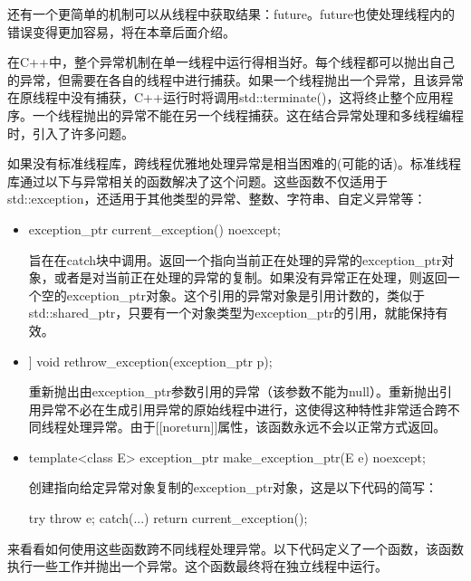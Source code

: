还有一个更简单的机制可以从线程中获取结果：future。future也使处理线程内的错误变得更加容易，将在本章后面介绍。


在C++中，整个异常机制在单一线程中运行得相当好。每个线程都可以抛出自己的异常，但需要在各自的线程中进行捕获。如果一个线程抛出一个异常，且该异常在原线程中没有捕获，C++运行时将调用std::terminate()，这将终止整个应用程序。一个线程抛出的异常不能在另一个线程捕获。这在结合异常处理和多线程编程时，引入了许多问题。

如果没有标准线程库，跨线程优雅地处理异常是相当困难的(可能的话)。标准线程库通过以下与异常相关的函数解决了这个问题。这些函数不仅适用于std::exception，还适用于其他类型的异常、整数、字符串、自定义异常等：

\begin{itemize}
\item
\begin{cpp}
exception_ptr current_exception() noexcept;
\end{cpp}

旨在在catch块中调用。返回一个指向当前正在处理的异常的exception\_ptr对象，或者是对当前正在处理的异常的复制。如果没有异常正在处理，则返回一个空的exception\_ptr对象。这个引用的异常对象是引用计数的，类似于std::shared\_ptr，只要有一个对象类型为exception\_ptr的引用，就能保持有效。

\item
\begin{cpp}
[[noreturn]] void rethrow_exception(exception_ptr p);
\end{cpp}

重新抛出由exception\_ptr参数引用的异常（该参数不能为null）。重新抛出引用异常不必在生成引用异常的原始线程中进行，这使得这种特性非常适合跨不同线程处理异常。由于[[noreturn]]属性，该函数永远不会以正常方式返回。

\item
\begin{cpp}
template<class E> exception_ptr make_exception_ptr(E e) noexcept;
\end{cpp}

创建指向给定异常对象复制的exception\_ptr对象，这是以下代码的简写：

\begin{cpp}
try { throw e; }
catch(...) { return current_exception(); }
\end{cpp}
\end{itemize}

来看看如何使用这些函数跨不同线程处理异常。以下代码定义了一个函数，该函数执行一些工作并抛出一个异常。这个函数最终将在独立线程中运行。

